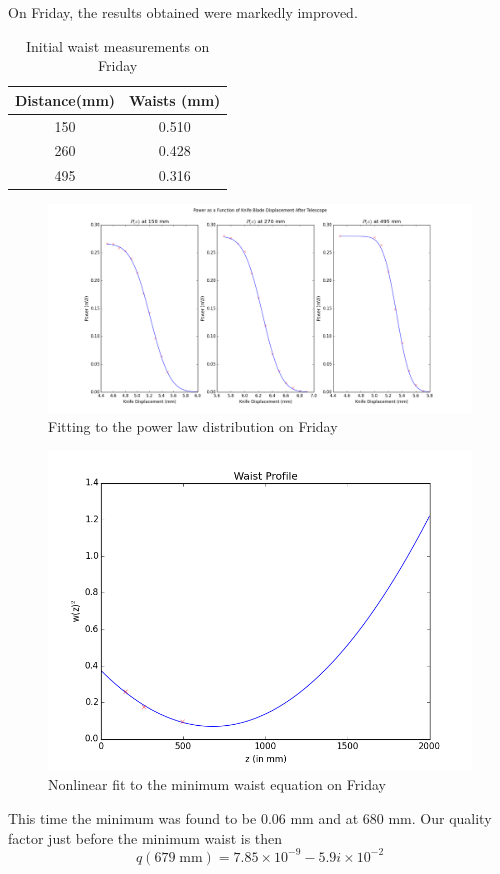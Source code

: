 \documentclass[10pt,a4paper]{article}
\begin{document}
\noindent On Friday, the results obtained were markedly improved. 
\begin{table}[H]
\centering
\begin{tabular}{|c|c|}
 \hline 
 Distance(mm) & Waists (mm) \\ 
 \hline 
 150 & 0.510 \\ 
 \hline 
 260 & 0.428 \\
 \hline
 495 & 0.316\\
 \hline
 \end{tabular}
\caption{Initial waist measurements on Friday}
\end{table}
\begin{figure}[H]
\centering
\includegraphics[scale=0.4]{../Analysis/friday_waists.png}
\caption{Fitting to the power law distribution on Friday} 
\end{figure}
\begin{figure}[H]
\centering
\includegraphics[scale=0.5]{../Analysis/friday_waists_fit.png}
\caption{Nonlinear fit to the minimum waist equation on Friday}
\end{figure}
\noindent This time the minimum was found to be 0.06 mm and at 680 mm. Our quality factor just before the minimum waist is then $$q(679\;\mathrm{mm}) = 7.85\times 10^{-9} -5.9i\times10^{-2}$$
\end{document}
